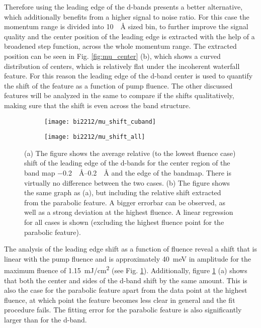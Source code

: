 Therefore using the leading edge of the  d-bands presents a better alternative, which additionally benefits from a higher signal to noise ratio.
For this case the momentum range is divided into \qty{10}{\per\angstrom} sized bin, to further improve the signal quality and the center position of the leading edge is extracted with the help of a broadened step function, across the whole momentum range.
The extracted position can be seen in Fig. \ref{fig:mu_center} (b), which shows a curved distribution of centers, which is relatively flat under the incoherent waterfall feature.
For this reason the leading edge of the  d-band center is used to quantify the shift of the feature as a function of pump fluence.
The other discussed features will be analyzed in the same to compare if the shifts qualitatively, making sure that the shift is even across the band structure.

\begin{figure}[b!]
	\centering
	\begin{subfigure}[b]{0.33\textwidth}
		\texttt{[image: bi2212/mu\_shift\_cuband]}
		\caption{}
	\end{subfigure}
	\begin{subfigure}[b]{0.33\textwidth}
		\texttt{[image: bi2212/mu\_shift\_all]}
		\caption{}
	\end{subfigure}
	\caption{(a) The figure shows the average relative (to the lowest fluence case) shift of the leading edge of the  d-bands for the center region of the band map \qtyrange{-0.2}{0.2}{\per\angstrom} and the edge of the bandmap. There is virtually no difference between the two cases. (b) The figure shows the same graph as (a), but including the relative shift extracted from the parabolic feature. A bigger errorbar can be observed, as well as a strong deviation at the highest fluence. A linear regression for all cases is shown (excluding the highest fluence point for the parabolic feature).}
	\label{fig:mu_shift}
\end{figure}

The analysis of the leading edge shift as a function of fluence reveal a shift that is linear with the pump fluence and is approximately \qty{40}{\milli\electronvolt} in amplitude for the maximum fluence of \qty{1.15}{\milli\joule/\centi\meter\squared} (see Fig. \ref{fig:mu_shift}).
Additionally, figure \ref{fig:mu_shift} (a) shows that both the center and sides of the  d-band shift by the same amount.
This is also the case for the parabolic feature apart from the data point at the highest fluence, at which point the feature becomes less clear in general and the fit procedure fails.
The fitting error for the parabolic feature is also significantly larger than for the  d-band.

